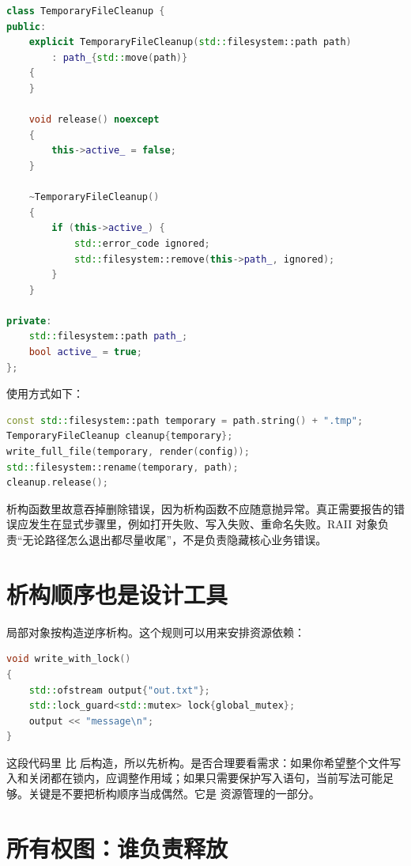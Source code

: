 \begin{lstlisting}[language=C++,caption={作用域守卫负责失败清理}]
class TemporaryFileCleanup {
public:
    explicit TemporaryFileCleanup(std::filesystem::path path)
        : path_{std::move(path)}
    {
    }

    void release() noexcept
    {
        this->active_ = false;
    }

    ~TemporaryFileCleanup()
    {
        if (this->active_) {
            std::error_code ignored;
            std::filesystem::remove(this->path_, ignored);
        }
    }

private:
    std::filesystem::path path_;
    bool active_ = true;
};
\end{lstlisting}

使用方式如下：

\begin{lstlisting}[language=C++,caption={提交成功后取消清理}]
const std::filesystem::path temporary = path.string() + ".tmp";
TemporaryFileCleanup cleanup{temporary};
write_full_file(temporary, render(config));
std::filesystem::rename(temporary, path);
cleanup.release();
\end{lstlisting}

析构函数里故意吞掉删除错误，因为析构函数不应随意抛异常。真正需要报告的错误应发生在显式步骤里，例如打开失败、写入失败、重命名失败。RAII 对象负责“无论路径怎么退出都尽量收尾”，不是负责隐藏核心业务错误。

\section{析构顺序也是设计工具}

局部对象按构造逆序析构。这个规则可以用来安排资源依赖：

\begin{lstlisting}[language=C++,caption={依赖对象要晚构造早析构}]
void write_with_lock()
{
    std::ofstream output{"out.txt"};
    std::lock_guard<std::mutex> lock{global_mutex};
    output << "message\n";
}
\end{lstlisting}

这段代码里  比  后构造，所以先析构。是否合理要看需求：如果你希望整个文件写入和关闭都在锁内，应调整作用域；如果只需要保护写入语句，当前写法可能足够。关键是不要把析构顺序当成偶然。它是 \cpp 资源管理的一部分。

\section{所有权图：谁负责释放}

